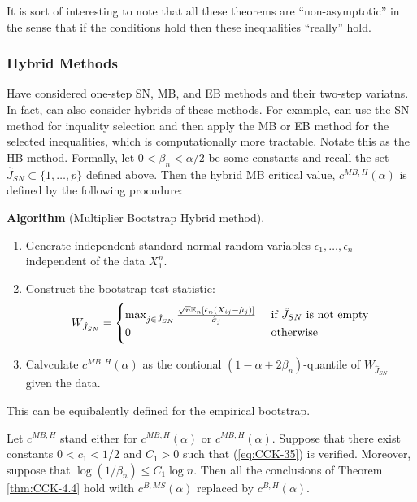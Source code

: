 It is sort of interesting to note that all these theorems are ``non-asymptotic'' in the sense that if the conditions hold then these inequalities ``really'' hold.

\subsubsection{Hybrid Methods}

Have considered one-step SN, MB, and EB methods and their two-step variatns. In fact, can also consider hybrids of these methods. For example, can use the SN method for inquality selection and then apply the MB or EB method for the selected inequalities, which is computationally more tractable. Notate this as the HB method. Formally, let $0 < \beta_n < \alpha/2$ be some constants and recall the set $\hat{J}_{SN}\subset \{1,\dots,p\}$ defined above. Then the hybrid MB critical value, $c^{MB,H}(\alpha)$ is defined by the following procudure:

\textbf{Algorithm} (Multiplier Bootstrap Hybrid method).
\begin{enumerate}
	\item Generate independent standard normal random variables $\epsilon_1,\dots, \epsilon_n$ independent of the data $X_1^n$.
	\item Construct the bootstrap test statistic: 
	\[W_{\hat{J}_{SN}} = \begin{cases}
	\max_{j \in \hat{J}_{SN}} \frac{\sqrt{n}\mathbb{E}_n[\epsilon_n(X_{ij} - \hat{\mu}_j)]}{\hat{\sigma}_j} & \text{ if $\hat{J}_{SN}$ is not empty} \\
	0 & \text{ otherwise}	
	\end{cases}\]
	\item Calvculate $c^{MB,H}(\alpha)$ as the contional $(1- \alpha + 2\beta_n)$-quantile of $W_{\hat{J}_{SN}}$ given the data.
\end{enumerate}

This can be equibalently defined for the empirical bootstrap.

\begin{theorem}
Let $c^{MB,H}$ stand either for $c^{MB,H}(\alpha)$ or $c^{MB,H}(\alpha)$. Suppose that there exist constants $0<c_1<1/2$ and $C_1 > 0$ such that (\ref{eq:CCK-35}) is verified. Moreover, suppose that $\log(1/\beta_n)\leq C_1 \log n$. Then all the conclusions of Theorem \ref{thm:CCK-4.4} hold wilth $c^{B,MS}(\alpha)$ replaced by $c^{B,H}(\alpha)$. 
\end{theorem}

